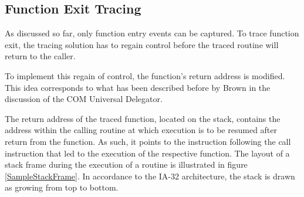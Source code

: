 \subsection{Function Exit Tracing}
\label{sec:FunctionExitTracing}
As discussed so far, only function entry events can be captured. To trace function exit,
the tracing solution has to regain control before the traced routine will return
to the caller.

To implement this regain of control, the function's return address is modified.
This idea corresponds to what has been described before by Brown \cite{Brown99_2} 
in the discussion of the COM Universal Delegator.

The return address of the traced function, located on the stack, contains the address within
the calling routine at which execution is to be resumed after return from the 
function. As such, it points to the instruction following the call instruction 
that led to the execution of the respective function. The layout of a stack frame
during the execution of a routine is illustrated in figure \ref{SampleStackFrame}.
In accordance to the IA-32 architecture, the stack is drawn as growing from top
to bottom.

